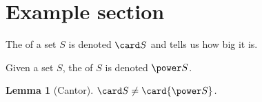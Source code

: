 \documentclass{omdoc}
\newtheorem{lemma}{Lemma}
\begin{document}
\section{Example section}


\begin{definition}[title=\capitalize\cardinality]
  The \emph{\cardinality} of a set $S$ is denoted $\card S$ and tells us how big it is.
\end{definition}

\begin{definition}[title=\capitalize\powerset]
  Given a set $S$, the \emph{\powerset} of $S$ is denoted $\power S$.
\end{definition}

\begin{lemma}[Cantor]
  $\card S\neq\card{\power S}$.
\end{lemma}
\end{document}
